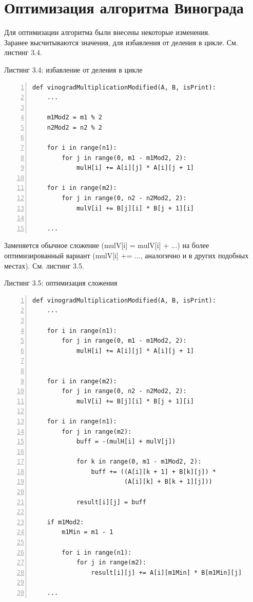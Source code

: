 \documentclass[12pt,a4paper]{report}
\begin{document}
\section{Оптимизация алгоритма Винограда}

Для оптимизации алгоритма были внесены некоторые изменения. \\

Заранее высчитываются значения, для избавления от деления в цикле. См. листинг 3.4.

\textrm{Листинг 3.4: избавление от деления в цикле}
\begin{lstlisting}[frame=single, numbers=left]
def vinogradMultiplicationModified(A, B, isPrint):
    ...

    m1Mod2 = m1 % 2
    n2Mod2 = n2 % 2

    for i in range(n1):
        for j in range(0, m1 - m1Mod2, 2):
            mulH[i] += A[i][j] * A[i][j + 1]
    
    for i in range(m2):
        for j in range(0, n2 - n2Mod2, 2):
            mulV[i] += B[j][i] * B[j + 1][i]
    
    ...
\end{lstlisting}

Заменяется обычное сложение (mulV[i] = mulV[i] + ...) на более оптимизированный вариант (mulV[i] += ..., аналогично 
и в других подобных местах). См. листинг 3.5.

\textrm{Листинг 3.5: оптимизация сложения}
\begin{lstlisting}[frame=single, numbers=left]
def vinogradMultiplicationModified(A, B, isPrint):
    ...

    for i in range(n1):
        for j in range(0, m1 - m1Mod2, 2):
            mulH[i] += A[i][j] * A[i][j + 1]


    for i in range(m2):
        for j in range(0, n2 - n2Mod2, 2):
            mulV[i] += B[j][i] * B[j + 1][i]

    for i in range(n1):
        for j in range(m2):
            buff = -(mulH[i] + mulV[j])

            for k in range(0, m1 - m1Mod2, 2):
                buff += ((A[i][k + 1] + B[k][j]) * 
                         (A[i][k] + B[k + 1][j]))

            result[i][j] = buff
    
    if m1Mod2:
        m1Min = m1 - 1
        
        for i in range(n1):
            for j in range(m2):
                result[i][j] += A[i][m1Min] * B[m1Min][j]

    ...
\end{lstlisting}
\end{document}

